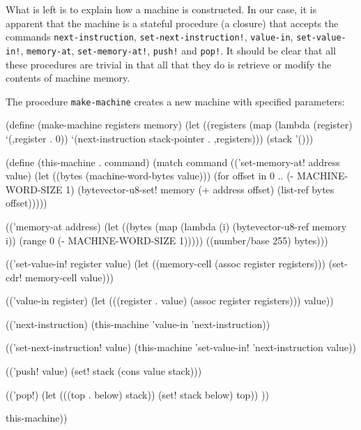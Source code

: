 What is left is to explain how a machine is constructed.
In our case, it is apparent that the machine is a stateful procedure
(a closure) that accepts the commands \texttt{next-instruction},
\texttt{set-next-instruction!}, \texttt{value-in}, \texttt{set\--value-in!},
\texttt{memory-at}, \texttt{set-memory-at!}, \texttt{push!} and \texttt{pop!}.
It should be clear that all these procedures are trivial in that all
that they do is retrieve or modify the contents of machine memory.

The procedure \texttt{make-machine} creates a new machine with specified
parameters:
\begin{Snippet}
(define (make-machine registers memory)
  (let ((registers (map (lambda (register)
			  `(,register . 0))
                        `(next-instruction stack-pointer
                                           . ,registers)))
	(stack '()))
\end{Snippet}
\begin{Snippet}
    (define (this-machine . command)
      (match command
	(('set-memory-at! address value)
	 (let ((bytes (machine-word-bytes value)))
	   (for offset in 0 .. (- MACHINE-WORD-SIZE 1)
		(bytevector-u8-set! memory (+ address offset)
				    (list-ref bytes offset)))))
\end{Snippet}
\begin{Snippet}
        (('memory-at address)
	 (let ((bytes (map (lambda (i)
			     (bytevector-u8-ref memory i))
			   (range 0  (- MACHINE-WORD-SIZE 1)))))
	   ((number/base 255) bytes)))
\end{Snippet}
\begin{Snippet}
	(('set-value-in! register value)
	 (let ((memory-cell (assoc register registers)))
	   (set-cdr! memory-cell value)))
\end{Snippet}
\begin{Snippet}	
	(('value-in register)
	 (let (((register . value) (assoc register registers)))
	   value))
\end{Snippet}
\begin{Snippet}	
	(('next-instruction)
	 (this-machine 'value-in 'next-instruction))
\end{Snippet}
\begin{Snippet}
	(('set-next-instruction! value)
	 (this-machine 'set-value-in! 'next-instruction value))
\end{Snippet}
\begin{Snippet}
	(('push! value)
	 (set! stack (cons value stack)))
\end{Snippet}
\begin{Snippet}
	(('pop!)
	 (let (((top . below) stack))
	   (set! stack below)
	   top))
	))
\end{Snippet}
\begin{Snippet}
    this-machine))
\end{Snippet}

